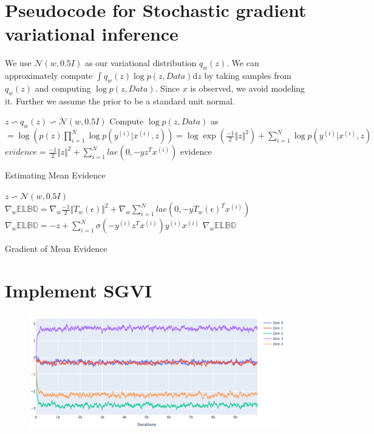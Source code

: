 \documentclass[11pt]{article}
\newcommand{\suml}[2]{\sum\limits_{#1}^{#2}}
\begin{document}
\clearpage
\section{Pseudocode for Stochastic gradient variational inference}

We use $\mathcal{N} (w, 0.5 I)$ as our variational distribution $q_w (z)$. We can approximately compute $\int q_w (z) \log p(z, Data) \mathrm{d}z$ by taking samples from $q_w (z)$ and computing $\log p (z, Data)$. Since $x$ is observed, we avoid modeling it. Further we assume the prior to be a standard unit normal.

\begin{algorithm}[!htbp]
    \SetAlgoLined
        $z \backsim q_w(z) \backsim \mathcal{N}(w, 0.5 I)$ \;
        Compute $\log p(z, Data)$ as \;
        $ = \log \left( p(z) \prod\limits_{i = 1}^N \log p(y^{(i)}|x^{(i)}, z) \right) = \log \exp (\frac{-1}{2} \Vert z \Vert^2) + \suml{i=1}{N} \log p(y^{(i)}|x^{(i)}, z)$ \;
        $evidence = \frac{-1}{2} \Vert z \Vert^2 + \suml{i=1}{N} lae(0, -y z^T x^{(i)})$ \;
    \Return evidence 
     \caption{Estimating Mean Evidence}
\end{algorithm}

\begin{algorithm}[!htbp]
    \SetAlgoLined
        $z \backsim \mathcal{N}(w, 0.5 I)$ \;
        $\nabla_w \mathbb{ELBO}  = \nabla_w \frac{-1}{2} \Vert T_w(\epsilon) \Vert^2 + \nabla_w \suml{i=1}{N} lae(0, -y T_w(\epsilon)^T x^{(i)})$ \;
        $\nabla_w \mathbb{ELBO} = -z + \suml{i = 1}{N} \sigma(-y^{(i)} z^T x^{(i)}) y^{(i)} x^{(i)} $ \;
        \Return $\nabla_w \mathbb{ELBO}$
     \caption{Gradient of Mean Evidence}
\end{algorithm}

\section{Implement SGVI}

\begin{figure}[H]
    \centering
    \includegraphics[width=\textwidth]{./images/w-plot.png}
\end{figure}
\end{document}
